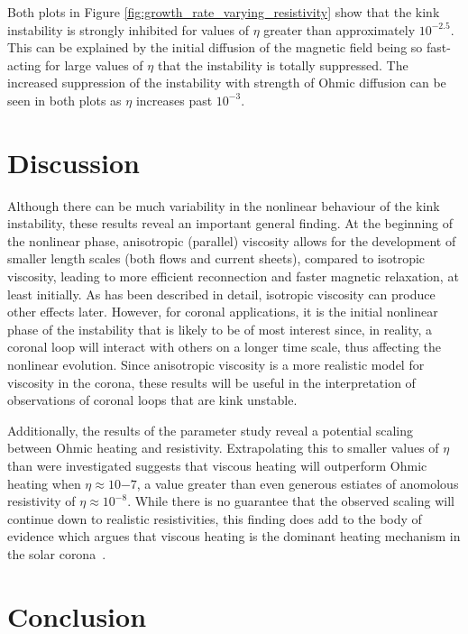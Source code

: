 Both plots in Figure \ref{fig:growth_rate_varying_resistivity} show that the kink instability is strongly inhibited for values of $\eta$ greater than approximately $10^{-2.5}$. This can be explained by the initial diffusion of the magnetic field being so fast-acting for large values of $\eta$ that the instability is totally suppressed. The increased suppression of the instability with strength of Ohmic diffusion can be seen in both plots as $\eta$ increases past $10^{-3}$.

\section{Discussion}

\label{sec:discussion}

Although there can be much variability in the nonlinear behaviour of the kink instability, these results reveal an important general finding. At the beginning of the nonlinear phase, anisotropic (parallel) viscosity allows for the development of smaller length scales (both flows and current sheets), compared to isotropic viscosity, leading to more efficient reconnection and faster magnetic relaxation, at least initially. As has been described in detail, isotropic viscosity can produce other effects later. However, for coronal applications, it is the initial nonlinear phase of the instability that is likely to be of most interest since, in reality, a coronal loop will interact with others on a longer time scale, thus affecting the nonlinear evolution. Since anisotropic viscosity is a more realistic model for viscosity in the corona, these results will be useful in the interpretation of observations of coronal loops that are kink unstable.

Additionally, the results of the parameter study reveal a potential scaling between Ohmic heating and resistivity. Extrapolating this to smaller values of $\eta$ than were investigated suggests that viscous heating will outperform Ohmic heating when $\eta\approx10{-7}$, a value greater than even generous estiates of anomolous resistivity of $\eta \approx 10^{-8}$. While there is no guarantee that the observed scaling will continue down to realistic resistivities, this finding does add to the body of evidence which argues that viscous heating is the dominant heating mechanism in the solar corona~\cite{craigAnisotropicViscousDissipation2009a,craigViscousDissipation3D2013}. 

\section{Conclusion}

